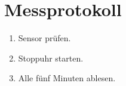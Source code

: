 \section{Messprotokoll}\label{anh:protokoll}
\begin{enumerate}
  \item Sensor prüfen.
  \item Stoppuhr starten.
  \item Alle fünf Minuten ablesen.
\end{enumerate}
